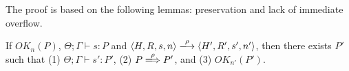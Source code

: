 
The proof is based on the following lemmas: preservation and lack of
immediate overflow.

\begin{lemma}[Preservation]
\label{lem:preservation}
If $OK_{n}(P)$, $\Theta; \Gamma \vdash s : P$ and $\langle H,R,s,n
\rangle \xlongrightarrow{\rho} \langle H',R',s', n' \rangle$, then
there exists $P'$ such that (1) $ \Theta; \Gamma \vdash s' : P'$, (2)
\(P \xLongrightarrow{\rho} P'\), and (3) \(OK_{n'}(P')\).
\end{lemma}


